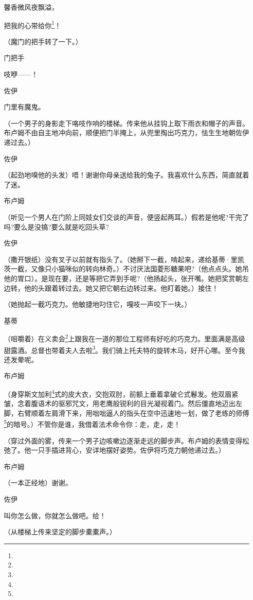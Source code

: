 \par 馨香微风夜飘溢，
\par 把我的心带给你\footnote{}！
\par （魔门的把手转了一下。）
\par 门把手
\par 吱咿——！
\par 佐伊
\par 门里有魔鬼。
\par （一个男子的身影走下咯吱作响的楼梯。传来他从挂钩上取下雨衣和帽子的声音。布卢姆不由自主地冲向前，顺便把门半掩上，从兜里掏出巧克力，怯生生地朝佐伊递过去。）
\par 佐伊
\par （起劲地嗅他的头发）唔！谢谢你母亲送给我的兔子。我喜欢什么东西，简直就着了迷。
\par 布卢姆
\par （听见一个男人在门阶上同妓女们交谈的声音，便竖起两耳。）假若是他呢?干完了吗?要么是没搞?要么就是吃回头草?
\par 佐伊
\par （撒开银纸）没有叉子以前就有指头了。（她掰下一截，啃起来，递给基蒂·里凯茨一截，又像只小猫咪似的转向林奇。）不讨厌法国菱形糖果吧?（他点点头。她吊他的胃口）。是现在要，还是等把它弄到手呢?（他扬起头，张开嘴。她把奖赏朝左边转，他的头跟着转过去。她又把它朝右边转过来。他盯着她。）接住！
\par （她抛起一截巧克力。他敏捷地叼住它，嘎吱一声咬下一块。）
\par 基蒂
\par （咀嚼着）在义卖会\footnote{}上跟我在一道的那位工程师有好吃的巧克力。里面满是高级甜露酒。总督也带着夫人去啦\footnote{}。我们骑上托夫特的旋转木马，好开心哪。至今我还发晕呢。
\par 布卢姆
\par （身穿斯文加利\footnote{}式的皮大衣，交抱双肘，前额上垂着拿破仑式鬈发。他双眉紧皱，念着腹语术的驱邪咒文，用老鹰般锐利的目光凝视着门。然后僵直地迈出左脚，右臂顺着左肩滑下来，用咄咄逼人的指头在空中迅速地一划，做了老练的师傅\footnote{}的暗号。）不管你是谁，我借着法术命令你：走，走，走！
\par （穿过外面的雾，传来一个男子边咳嗽边逐渐走远的脚步声。布卢姆的表情变得松弛了。他一只手插进背心，安详地摆好姿势。佐伊将巧克力朝他递过去。）
\par 布卢姆
\par （一本正经地）谢谢。
\par 佐伊
\par 叫你怎么做，你就怎么做吧。给！
\par （从楼梯上传来坚定的脚步橐橐声。）
